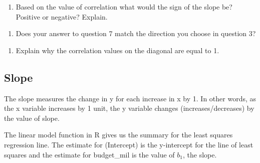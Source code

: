 \documentclass[
]{report}
\newenvironment{Shaded}{\begin{snugshade}}{\end{snugshade}}
\newcommand{\CommentTok}[1]{\textcolor[rgb]{0.56,0.35,0.01}{\textit{#1}}}
\newcommand{\DataTypeTok}[1]{\textcolor[rgb]{0.13,0.29,0.53}{#1}}
\newcommand{\KeywordTok}[1]{\textcolor[rgb]{0.13,0.29,0.53}{\textbf{#1}}}
\newcommand{\NormalTok}[1]{#1}
\newcommand{\OperatorTok}[1]{\textcolor[rgb]{0.81,0.36,0.00}{\textbf{#1}}}
\newcommand{\StringTok}[1]{\textcolor[rgb]{0.31,0.60,0.02}{#1}}
\providecommand{\tightlist}{%
  \setlength{\itemsep}{0pt}\setlength{\parskip}{0pt}}
\begin{document}
\begin{enumerate}
\def\labelenumi{\arabic{enumi}.}
\setcounter{enumi}{6}
\tightlist
\item
  Based on the value of correlation what would the sign of the slope be? Positive or negative? Explain.
\end{enumerate}

\vspace{1in}

\begin{enumerate}
\def\labelenumi{\arabic{enumi}.}
\setcounter{enumi}{7}
\tightlist
\item
  Does your answer to question 7 match the direction you choose in question 3?
\end{enumerate}

\vspace{0.3in}

\begin{enumerate}
\def\labelenumi{\arabic{enumi}.}
\setcounter{enumi}{8}
\tightlist
\item
  Explain why the correlation values on the diagonal are equal to 1.
\end{enumerate}

\vspace{1in}

\hypertarget{slope}{%
\subsection{Slope}\label{slope}}

The slope measures the change in y for each increase in x by 1. In other words, as the x variable increases by 1 unit, the y variable changes (increases/decreases) by the value of slope.

The linear model function in R gives us the summary for the least squares regression line. The estimate for (Intercept) is the y-intercept for the line of least squares and the estimate for budget\_mil is the value of \(b_1\), the slope.

\begin{Shaded}
\end{Shaded}
\end{document}
